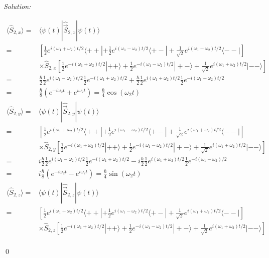 \documentclass[12pt,a4paper]{article}
\newenvironment{sol}
    {\emph{Solution:}
    }
    {
    \qed
    }
\begin{document}
\begin{sol}
\begin{itemize}
\begin{align}
\nonumber\langle\hat{S}_{2,x}\rangle=&\langle\psi(t)|\hat{\vec{S}}_{2,x}|\psi(t)\rangle\\
\nonumber=&[\frac{1}{2}e^{i(\omega_1+\omega_2)t/2}\langle++|+\frac{1}{2}e^{i(\omega_1-\omega_2)t/2}\langle+-|+\frac{1}{\sqrt{2}}e^{i(\omega_1+\omega_2)t/2}\langle--|]\\
\nonumber&\times\hat{S}_{2,x}[\frac{1}{2}e^{-i(\omega_1+\omega_2)t/2}|++\rangle+\frac{1}{2}e^{-i(\omega_1-\omega_2)t/2}|+-\rangle+\frac{1}{\sqrt{2}}e^{i(\omega_1+\omega_2)t/2}|--\rangle]\\
\nonumber=&\frac{\hbar}{2}\frac{1}{2}e^{i(\omega_1-\omega_2)t/2}\frac{1}{2}e^{-i(\omega_1+\omega_2)t/2}+\frac{\hbar}{2}\frac{1}{2}e^{i(\omega_1+\omega_2)t/2}\frac{1}{2}e^{-i(\omega_1-\omega_2)t/2}\\
=&\frac{\hbar}{8}(e^{-i\omega_2t}+e^{i\omega_2t})=\frac{\hbar}{4}\cos(\omega_2t)
\end{align}
\begin{align}
\nonumber\langle\hat{S}_{2,y}\rangle=&\langle\psi(t)|\hat{\vec{S}}_{2,y}|\psi(t)\rangle\\
\nonumber=&[\frac{1}{2}e^{i(\omega_1+\omega_2)t/2}\langle++|+\frac{1}{2}e^{i(\omega_1-\omega_2)t/2}\langle+-|+\frac{1}{\sqrt{2}}e^{i(\omega_1+\omega_2)t/2}\langle--|]\\
\nonumber&\times\hat{S}_{2,y}[\frac{1}{2}e^{-i(\omega_1+\omega_2)t/2}|++\rangle+\frac{1}{2}e^{-i(\omega_1-\omega_2)t/2}|+-\rangle+\frac{1}{\sqrt{2}}e^{i(\omega_1+\omega_2)t/2}|--\rangle]\\
\nonumber=&i\frac{\hbar}{2}\frac{1}{2}e^{i(\omega_1-\omega_2)t/2}\frac{1}{2}e^{-i(\omega_1+\omega_2)t/2}-i\frac{\hbar}{2}\frac{1}{2}e^{i(\omega_1+\omega_2)t/2}\frac{1}{2}e^{-i(\omega_1-\omega_2)/2}\\
=&i\frac{\hbar}{8}(e^{-i\omega_2t}-e^{i\omega_2t})=\frac{\hbar}{4}\sin(\omega_2t)
\end{align}
\begin{align}
\nonumber\langle\hat{S}_{2,z}\rangle=&\langle\psi(t)|\hat{\vec{S}}_{2,z}|\psi(t)\rangle\\
\nonumber=&[\frac{1}{2}e^{i(\omega_1+\omega_2)t/2}\langle++|+\frac{1}{2}e^{i(\omega_1-\omega_2)t/2}\langle+-|+\frac{1}{\sqrt{2}}e^{i(\omega_1+\omega_2)t/2}\langle--|]\\
\nonumber&\times\hat{S}_{2,z}[\frac{1}{2}e^{-i(\omega_1+\omega_2)t/2}|++\rangle+\frac{1}{2}e^{-i(\omega_1-\omega_2)t/2}|+-\rangle+\frac{1}{\sqrt{2}}e^{i(\omega_1+\omega_2)t/2}|--\rangle]\\

\end{align}
\end{itemize}
\end{sol}
\end{document}
